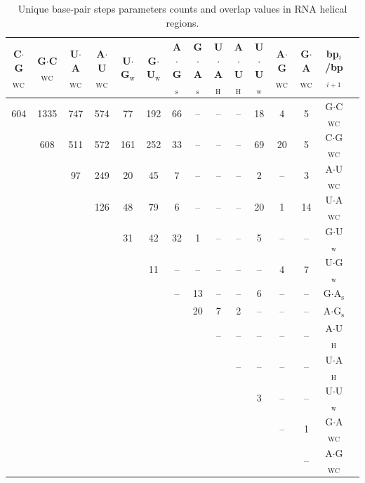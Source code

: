 \begin{table}
\begin{center}
\begin{tabular}{|c|c|c|c|c|c|c|c|c|c|c|c|c|c|c|}
\hline
C$\cdot$G$_{\text{WC}}$ & G$\cdot$C$_{\text{WC}}$ & U$\cdot$A$_{\text{WC}}$ &
A$\cdot$U$_{\text{WC}}$ & U$\cdot$G$_{\text{w}}$ &
G$\cdot$U$_{\text{w}}$ & A$\cdot$G$_{\text{s}}$ &
G$\cdot$A$_{\text{s}}$ & U$\cdot$A$_{\text{H}}$ &
A$\cdot$U$_{\text{H}}$ & U$\cdot$U$_{\text{w}}$ &
A$\cdot$G$_{\text{WC}}$ & G$\cdot$A$_{\text{WC}}$ & bp$_{i}$/bp$_{i+1}$\\ 
\hline  
604 & 1335 & 747 & 574 & 77 & 192 & 66 & -- & -- & -- & 18 & 4 & 5 & G$\cdot$C$_{\text{WC}}$\\
 & 608 & 511 & 572 & 161 & 252 & 33 & -- & -- & -- & 69 & 20 & 5 & C$\cdot$G$_{\text{WC}}$\\
 &  & 97 & 249 & 20 & 45 & 7 & -- & -- & -- & 2 & -- & 3 & A$\cdot$U$_{\text{WC}}$\\
 &  &  & 126 & 48 & 79 & 6 & -- & -- & -- & 20 & 1 & 14 & U$\cdot$A$_{\text{WC}}$\\
 &  &  &  & 31 & 42 & 32 & 1 & -- & -- & 5 & -- & -- & G$\cdot$U$_{\text{w}}$\\
 &  &  &  &  & 11 & -- & -- & -- & -- & -- & 4 & 7 & U$\cdot$G$_{\text{w}}$\\
 &  &  &  &  &  & -- & 13 & -- & -- & 6 & -- & -- & G$\cdot$A$_{\text{s}}$\\ 
 &  &  &  &  &  &  & 20 & 7 & 2 & -- & -- & -- & A$\cdot$G$_{\text{s}}$\\
 &  &  &  &  &  &  &  & -- & -- & -- & -- & -- & A$\cdot$U$_{\text{H}}$\\
 &  &  &  &  &  &  &  &  & -- & -- & -- & -- & U$\cdot$A$_{\text{H}}$\\
 &  &  &  &  &  &  &  &  &  & 3 & -- & -- & U$\cdot$U$_{\text{w}}$\\
 &  &  &  &  &  &  &  &  &  &  & -- & 1 & G$\cdot$A$_{\text{WC}}$\\
 &  &  &  &  &  &  &  &  &  &  &  & -- & A$\cdot$G$_{\text{WC}}$\\
\hline
\end{tabular}
\caption{Unique base-pair steps parameters counts and overlap values
  in RNA helical regions.}
\label{tab:91steps}
\end{center}
\end{table}

  

